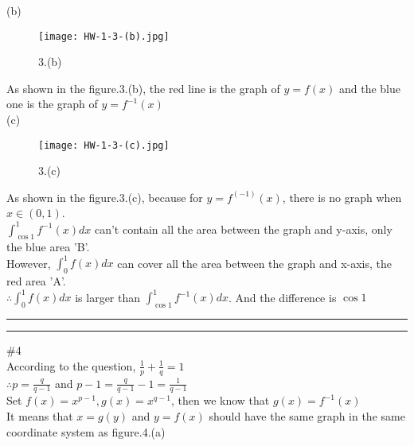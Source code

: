 \documentclass{article}
\begin{document}
(b)\\

\begin{figure}[H]
  \centering
  \texttt{[image: HW-1-3-(b).jpg]}\\
  \caption*{3.(b)}
\end{figure}

As shown in the figure.3.(b), the red line is the graph of $y=f(x)$ and the blue one is the graph of $y=f^{-1}(x)$\\

(c)\\

\begin{figure}[H]
  \centering
  \texttt{[image: HW-1-3-(c).jpg]}\\
  \caption*{3.(c)}
\end{figure}

As shown in the figure.3.(c), because for $y=f^(-1)(x)$, there is no graph when $x\in(0,1)$.\\

$\int_{\cos1}^{1}f^{-1}(x)dx$ can't contain all the area between the graph and y-axis, only the blue area 'B'.\\

However, $\int_{0}^{1}f(x)dx$ can cover all the area between the graph and x-axis, the red area 'A'.\\

$\therefore$\qquad$\int_{0}^{1}f(x)dx$ is larger than $\int_{\cos1}^{1}f^{-1}(x)dx$. And the difference is $\cos1$\\

\vskip 2cm
\hrule
\vskip 1mm
\hrule
\vskip 0.5cm

\textcolor[rgb]{0.00,0.00,0.50}{\#4}\\

According to the question, $\displaystyle\frac{1}{p}+\frac{1}{q}=1$\\

$\therefore$\qquad$\displaystyle p=\frac{q}{q-1}$ and $\displaystyle p-1=\frac{q}{q-1}-1=\frac{1}{q-1}$\\

Set $f(x)=x^{p-1}, g(x)=x^{q-1}$, then we know that $g(x)=f^{-1}(x)$\\

It means that $x=g(y)$ and $y=f(x)$ should have the same graph in the same coordinate system as figure.4.(a)\\
\end{document}
